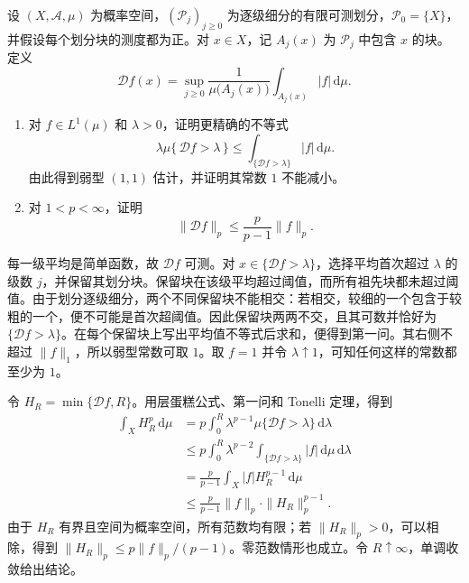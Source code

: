 \begin{optionalexercise}\label{b1:ex:13-partition-maximal}
设 \((X,\mathcal A,\mu)\) 为概率空间，\((\mathcal P_j)_{j\ge0}\) 为逐级细分的有限可测划分，\(\mathcal P_0=\{X\}\)，并假设每个划分块的测度都为正。对 \(x\in X\)，记 \(A_j(x)\) 为 \(\mathcal P_j\) 中包含 \(x\) 的块。定义
\[
 \mathcal Df(x)=\sup_{j\ge0}\frac1{\mu\bigl(A_j(x)\bigr)}
 \int_{A_j(x)}|f|\,\mathrm d\mu.
\]
\begin{enumerate}
\item\label{b1:item:13-partition-weak}
对 \(f\in L^1(\mu)\) 和 \(\lambda>0\)，证明更精确的不等式
\[
 \lambda\mu\{\,\mathcal Df>\lambda\,\}
 \le\int_{\{\mathcal Df>\lambda\}}|f|\,\mathrm d\mu.
\]
由此得到弱型 \((1,1)\) 估计，并证明其常数 \(1\) 不能减小。
\item\label{b1:item:13-partition-strong}
对 \(1<p<\infty\)，证明
\[
 \|\mathcal Df\|_p\le\frac p{p-1}\|f\|_p.
\]
\end{enumerate}
\end{optionalexercise}
\begin{solution}
每一级平均是简单函数，故 \(\mathcal Df\) 可测。对 \(x\in\{\mathcal Df>\lambda\}\)，选择平均首次超过 \(\lambda\) 的级数 \(j\)，并保留其划分块。保留块在该级平均超过阈值，而所有祖先块都未超过阈值。由于划分逐级细分，两个不同保留块不能相交：若相交，较细的一个包含于较粗的一个，便不可能是首次超阈值。因此保留块两两不交，且其可数并恰好为 \(\{\mathcal Df>\lambda\}\)。在每个保留块上写出平均值不等式后求和，便得到第一问。其右侧不超过 \(\|f\|_1\)，所以弱型常数可取 \(1\)。取 \(f=1\) 并令 \(\lambda\uparrow1\)，可知任何这样的常数都至少为 \(1\)。

令 \(H_R=\min\{\mathcal Df,R\}\)。用层蛋糕公式、第一问和 Tonelli 定理，得到
\begin{align*}
 \int_XH_R^p\,\mathrm d\mu
 &=p\int_0^R\lambda^{p-1}\mu\{\mathcal Df>\lambda\}\,\mathrm d\lambda\\
 &\le p\int_0^R\lambda^{p-2}
       \int_{\{\mathcal Df>\lambda\}}|f|\,\mathrm d\mu\,\mathrm d\lambda\\
 &=\frac p{p-1}\int_X|f|H_R^{p-1}\,\mathrm d\mu\\
 &\le\frac p{p-1}\|f\|_p\cdot\|H_R\|_p^{p-1}.
\end{align*}
由于 \(H_R\) 有界且空间为概率空间，所有范数均有限；若 \(\|H_R\|_p>0\)，可以相除，得到 \(\|H_R\|_p\le p\|f\|_p/(p-1)\)。零范数情形也成立。令 \(R\uparrow\infty\)，单调收敛给出结论。
\end{solution}

